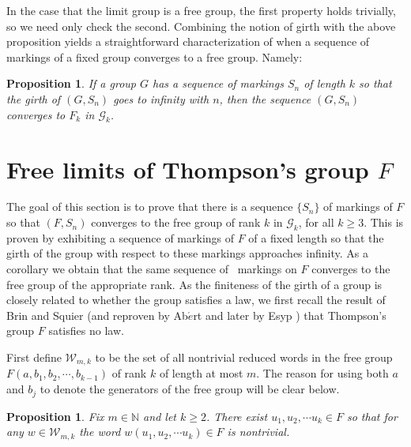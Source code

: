 \documentclass[11pt]{amsart}
\newtheorem{proposition}[theorem]{Proposition}
\begin{document}
In the case that the limit group is a free group, the first
property holds trivially, so we need only check the second.
Combining the notion of girth with the above proposition yields a
straightforward characterization of when a sequence of markings of
a fixed group converges to a free group. Namely:

\begin{proposition}\label{covergence to free}
 If a group $G$ has a sequence of markings $S_n$ of length
$k$ so that the girth of $(G,S_n)$ goes to infinity with $n$, then
the sequence $(G,S_n)$ converges to $F_k$ in ${\mathcal G}_k$.
\end{proposition}

\section{Free limits of Thompson's group $F$}
\label{sec:free}

The goal of this section is to prove that there is a sequence
$\{S_n\}$ of markings of $F$ so that $(F,S_n)$ converges to the
free group of rank $k$ in ${\mathcal G}_k$, for all $k \geq 3$.
This is proven by exhibiting a sequence of markings of $F$ of a fixed length so that
the girth of the group with respect to these markings approaches infinity.  As a corollary we obtain that the same sequence of \
markings on $F$ converges to the free group of the appropriate rank.
As the finiteness of the girth of a group is closely related to whether the group satisfies a law, we first recall
the result of Brin and Squier \cite{BS1} (and reproven by Ab$\acute{e}$rt \cite{A} and later by Esyp \cite{E}) that Thompson's group $F$ satisfies no law.

First define ${{\mathcal W}_{m,k}}$ to be the set of all nontrivial reduced words in the free group $F(a,b_1,b_2, \cdots ,b_{k-1})$ of rank $k$ of length at most $m$.
The reason for using both $a$ and $b_j$ to denote the generators of the free group will be clear below.

\begin{proposition} \label{prop:length-at-most-m}
Fix $m \in {\mathbb N}$ and let $k \geq 2$.  There exist $u_1, u_2, \cdots u_{k} \in F$ so that for any $w \in {{\mathcal W}_{m,k}}$ the word $w(u_1, u_2, \cdots u_{k}) \in F$ is nontrivial.
\end{proposition}
\end{document}
